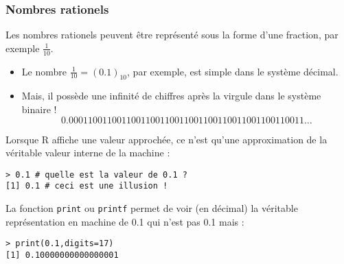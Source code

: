 \documentclass[10pt]{beamer}
\begin{document}

\begin{frame}[fragile]
  \frametitle{Nombres rationels}
  Les nombres rationels peuvent être représenté sous la forme d'une fraction, par exemple $\frac{1}{10}$.
  \begin{itemize}
  \item Le nombre $\frac{1}{10} = (0.1)_{10}$, par exemple, est simple dans le système décimal.
  \item Mais, il possède une infinité de chiffres après la virgule dans le système binaire !
    \[0.0001100110011001100110011001100110011001100110011\ldots\]
  \end{itemize}
  Lorsque R affiche une valeur approchée, ce n'est qu'une approximation de la véritable valeur interne de la machine :
  \begin{lstlisting}
> 0.1 # quelle est la valeur de 0.1 ?
[1] 0.1 # ceci est une illusion !    
\end{lstlisting}

La fonction \texttt{print} ou \texttt{printf} permet de voir (en décimal) la véritable représentation en machine de 0.1 qui n'est pas 0.1 mais :
\begin{lstlisting}
> print(0.1,digits=17)
[1] 0.10000000000000001
\end{lstlisting}
\end{frame}
\end{document}
